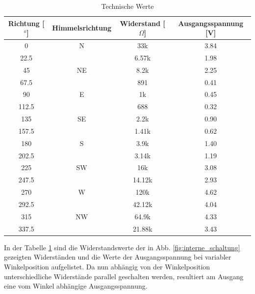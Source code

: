 \begin{table}[h]
\centering
\caption{Technische Werte \cite{ADSkeineAngabe}}
\begin{tabular}{|c|c|c|c|}
\hline 
Richtung [$^{o}$] & Himmelsrichtung & Widerstand [$\Omega$] & Ausgangsspannung [V] \\ 
\hline 
0 & N & 33k & 3.84 \\ 
\hline 
22.5 &  & 6.57k & 1.98 \\ 
\hline 
45 & NE & 8.2k & 2.25 \\ 
\hline 
67.5 &  & 891 & 0.41 \\ 
\hline 
90 & E & 1k & 0.45 \\ 
\hline 
112.5 &  & 688 & 0.32 \\ 
\hline 
135 & SE & 2.2k & 0.90 \\ 
\hline 
157.5 &  & 1.41k & 0.62 \\ 
\hline 
180 & S & 3.9k & 1.40 \\ 
\hline 
202.5 &  & 3.14k & 1.19 \\ 
\hline 
225 & SW & 16k & 3.08 \\ 
\hline 
247.5 &  & 14.12k & 2.93 \\ 
\hline 
270 & W & 120k & 4.62 \\ 
\hline 
292.5 &  & 42.12k & 4.04 \\ 
\hline 
315 & NW & 64.9k & 4.33 \\ 
\hline 
337.5 &  & 21.88k & 3.43 \\ 
\hline 
\end{tabular} 
\label{tab:technische_werte}
\end{table}

In der Tabelle \ref{tab:technische_werte} sind die Widerstandswerte der in Abb. \ref{fig:interne_schaltung} gezeigten Widerständen und die Werte der Ausgangsspannung bei variabler Winkelposition aufgelistet. Da nun abhängig von der Winkelposition unterschiedliche Widerstände parallel geschalten werden, resultiert am Ausgang eine vom Winkel abhängige Ausgangsspannung.\\

\newpage


